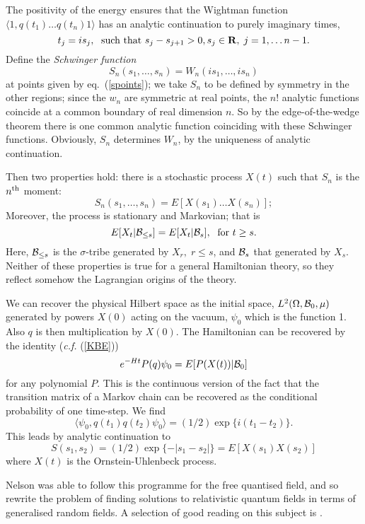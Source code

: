 The positivity of the energy ensures that the Wightman function
$\langle 1,q(t_1)\ldots q(t_n)1\rangle$
 has an analytic continuation to purely imaginary times, 
\begin{equation}
t_j=is_j,\;\mbox{ such that }s_j-s_{j+1}>0, s_j\in{\bf R},\;j=1,\ldots n-1.
\label{spoints}
\end{equation}
Define the {\em Schwinger function}
\begin{equation}
S_n(s_1,\ldots,s_n)=W_n(is_1,\ldots,is_n)
\end{equation}
at points given by eq.~(\ref{spoints}); we take $S_n$ to be defined
by symmetry in the other regions; since the $w_n$ are symmetric at
real points, the $n!$ analytic functions coincide at a common boundary
of real dimension $n$. So by the edge-of-the-wedge theorem \cite{SW}
there is one common analytic function coinciding with these
Schwinger functions. Obviously, $S_n$ determines $W_n$, by the
uniqueness of analytic continuation.

Then two properties hold: there is a stochastic process $X(t)$
such that $S_n$ is the $n^{\rm th}$ moment:
\[S_n(s_1,\ldots,s_n)=E[X(s_1)\ldots X(s_n)];\]
Moreover, the process is stationary and Markovian; that is
\begin{equation}
E[X_t|{\cal B}_{\leq s}]=E[X_t|{\cal B}_s],\;\mbox{ for }t\geq s.
\end{equation}
Here, ${\cal B}_{\leq s}$ is the $\sigma$-tribe generated by $X_r,\;r\leq
s$, and ${\cal B}_s$ that generated by $X_s$.
Neither of these properties is true for a general Hamiltonian theory, so
they reflect somehow the Lagrangian origins of the theory.

We can recover the physical Hilbert space as the initial space, $L^2(\Omega,
{\cal B}_0,\mu)$ generated by powers $X(0)$ acting on the vacuum, $\psi_0$
which is the function 1. Also $q$ is then multiplication
by $X(0)$. The Hamiltonian can be recovered by the identity
({\em c.f.} (\ref{KBE}))
\begin{equation}
e^{-Ht}P(q)\psi_0=E[P(X(t))|{\cal B}_0]
\end{equation}
for any polynomial $P$.
This is the continuous version of the fact that the transition matrix of
a Markov chain can be recovered as the conditional probability of one
time-step.
We find
\begin{equation}
\langle\psi_0,q(t_1)q(t_2)\psi_0\rangle=(1/2)\exp\{i(t_1-t_2)\}.
\end{equation}
This leads by analytic continuation to
\begin{equation}
S(s_1,s_2)=(1/2)\exp\{-|s_1-s_2|\}=E[X(s_1)X(s_2)]
\end{equation}
where $X(t)$ is the Ornstein-Uhlenbeck process.

Nelson was able to follow this programme for the free quantised field,
and so rewrite the problem of finding solutions to relativistic
quantum fields in terms of generalised random fields. A selection of
good reading on this subject is \cite{Minlos,Wong,Nelson2,Simon2,Gross2}.

